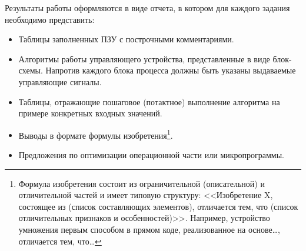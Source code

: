 Результаты работы оформляются в виде отчета, в котором для каждого задания необходимо представить:
\begin{itemize}
    \item Таблицы заполненных ПЗУ с построчными комментариями.
    \item Алгоритмы работы управляющего устройства, представленные в виде блок-схемы. Напротив каждого блока процесса должны быть указаны выдаваемые управляющие сигналы.
    \item Таблицы, отражающие пошаговое (потактное) выполнение алгоритма на примере конкретных входных значений.
    \item Выводы в формате формулы изобретения\footnote{Формула изобретения состоит из ограничительной (описательной) и отличительной частей и имеет типовую структуру: <<Изобретение X, состоящее из (список составляющих элементов), отличается тем, что (список отличительных признаков и особенностей)>>. Например, устройство умножения первым способом в прямом коде, реализованное на основе\ldots, отличается тем, что\ldots}. 
    \item Предложения по оптимизации операционной части или микропрограммы.
\end{itemize}

